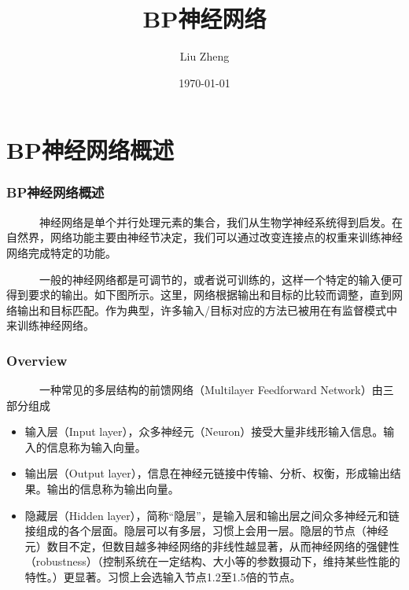 \documentclass[slidestop,compress,mathserif,c]{beamer}
\title{BP神经网络}
\author{Liu Zheng}
\date{\today}
\institute{同济大学电信学院}
\begin{document}
\frame{\titlepage}
\AtBeginSection{
  \frame{\tableofcontents[sections={\thesection}]}
}
\section{BP神经网络概述}


\begin{frame}
\frametitle{BP神经网络概述}
~~~~~~神经网络是单个并行处理元素的集合，我们从生物学神经系统得到启发。在自然界，网络功能主要由神经节决定，我们可以通过改变连接点的权重来训练神经网络完成特定的功能。

~~~~~~一般的神经网络都是可调节的，或者说可训练的，这样一个特定的输入便可得到要求的输出。如下图所示。这里，网络根据输出和目标的比较而调整，直到网络输出和目标匹配。作为典型，许多输入/目标对应的方法已被用在有监督模式中来训练神经网络。 

\end{frame}

\begin{frame}
\frametitle{Overview}
~~~~~~一种常见的多层结构的前馈网络（Multilayer Feedforward Network）由三部分组成

\begin{itemize}
\item 输入层（Input layer），众多神经元（Neuron）接受大量非线形输入信息。输入的信息称为输入向量。
\item 输出层（Output layer），信息在神经元链接中传输、分析、权衡，形成输出结果。输出的信息称为输出向量。
\item 隐藏层（Hidden layer），简称“隐层”，是输入层和输出层之间众多神经元和链接组成的各个层面。隐层可以有多层，习惯上会用一层。隐层的节点（神经元）数目不定，但数目越多神经网络的非线性越显著，从而神经网络的强健性（robustness）（控制系统在一定结构、大小等的参数摄动下，维持某些性能的特性。）更显著。习惯上会选输入节点1.2至1.5倍的节点。
\end{itemize}
\end{frame}


\end{document}
